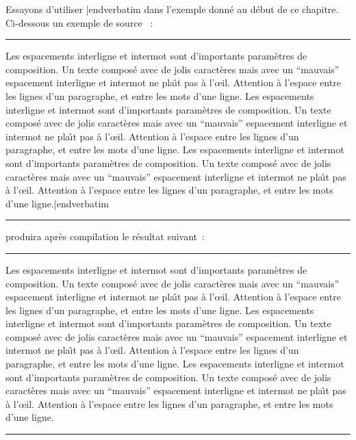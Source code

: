 Essayons d'utiliser {\color{brown}\verbatim \fontspacing|endverbatim} dans l'exemple donn\'e au d\'ebut de ce chapitre. Ci-dessous un exemple de source \capstex~:


\newpage

\bigskip\hrule\vbox{\noindent\vrule\NoBlackBoxes\vbox{\vskip2mm
{\obeylines\parindent=0pt\color{brown}
\verbatim
\parindent=0pt
\fontspacing %
Les espacements interligne et intermot sont d'importants param\`etres de composition. Un texte compos\'e avec de jolis caract\`eres mais avec un ``mauvais'' espacement interligne et intermot ne pla\^\i t pas \`a l'\oe il. Attention \`a l'espace entre les lignes d'un paragraphe, et entre les mots d'une ligne.
\medskip
\sixrm %
\fontspacing %
Les espacements interligne et intermot sont d'importants param\`etres de composition. Un texte compos\'e avec de jolis caract\`eres mais avec un ``mauvais'' espacement interligne et intermot ne pla\^\i t pas \`a l'\oe il. Attention \`a l'espace entre les lignes d'un paragraphe, et entre les mots d'une ligne.
\medskip
\eighteenrm %
\fontspacing %
Les espacements interligne et intermot sont d'importants param\`etres de composition. Un texte compos\'e avec de jolis caract\`eres mais avec un ``mauvais'' espacement interligne et intermot ne pla\^\i t pas \`a l'\oe il. Attention \`a l'espace entre les lignes d'un paragraphe, et entre les mots d'une ligne.|endverbatim}
\vskip2mm}\vrule}\hrule\BlackBoxes\bigskip


\nopagebreak\ii \nopagebreak\ii produira apr\`es compilation le r\'esultat suivant~:\nopagebreak


\bigskip\hrule\vbox{\noindent\vrule\NoBlackBoxes\vbox{\vskip2mm
{\parindent=0pt
\fontspacing %
Les espacements interligne et intermot sont d'importants param\`etres de composition. Un texte compos\'e avec de jolis caract\`eres mais avec un ``mauvais'' espacement interligne et intermot ne pla\^\i t pas \`a l'\oe il. Attention \`a l'espace entre les lignes d'un paragraphe, et entre les mots d'une ligne.
\medskip
\sixrm %
\fontspacing %
Les espacements interligne et intermot sont d'importants param\`etres de composition. Un texte compos\'e avec de jolis caract\`eres mais avec un ``mauvais'' espacement interligne et intermot ne pla\^\i t pas \`a l'\oe il. Attention \`a l'espace entre les lignes d'un paragraphe, et entre les mots d'une ligne.
\medskip
\eighteenrm %
\fontspacing %
Les espacements interligne et intermot sont d'importants param\`etres de composition. Un texte compos\'e avec de jolis caract\`eres mais avec un ``mauvais'' espacement interligne et intermot ne pla\^\i t pas \`a l'\oe il. Attention \`a l'espace entre les lignes d'un paragraphe, et entre les mots d'une ligne.}
\vskip2mm}\vrule}\hrule\BlackBoxes\bigskip\bigskip


